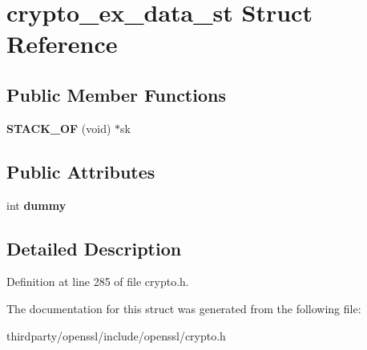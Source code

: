 \hypertarget{structcrypto__ex__data__st}{}\section{crypto\+\_\+ex\+\_\+data\+\_\+st Struct Reference}
\label{structcrypto__ex__data__st}
\subsection*{Public Member Functions}
\begin{DoxyCompactItemize}
\item 
\mbox{\label{structcrypto__ex__data__st_a93c15b810c664dd4371409fbcca0e68a}} 
{\bfseries S\+T\+A\+C\+K\+\_\+\+OF} (void) $\ast$sk
\end{DoxyCompactItemize}
\subsection*{Public Attributes}
\begin{DoxyCompactItemize}
\item 
\mbox{\label{structcrypto__ex__data__st_a1aa7e9db2ba85dfdcde7d21eb9c6897d}} 
int {\bfseries dummy}
\end{DoxyCompactItemize}


\subsection{Detailed Description}


Definition at line 285 of file crypto.\+h.



The documentation for this struct was generated from the following file\+:\begin{DoxyCompactItemize}
\item 
thirdparty/openssl/include/openssl/crypto.\+h\end{DoxyCompactItemize}
